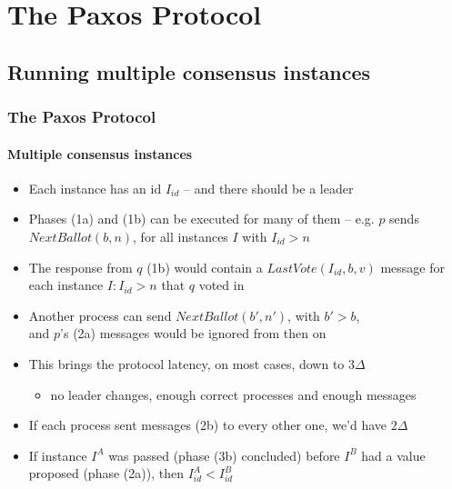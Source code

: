 \documentclass[10 pt]{beamer}
\begin{document}
\section{The Paxos Protocol}

\subsection{Running multiple consensus instances}


\begin{frame}
  \frametitle{The \textbf{Paxos} Protocol}
  \framesubtitle{Multiple consensus instances}
  
  \begin{itemize}
    \item Each instance has an id $I_{id}$ -- and there should be a leader %

    \pause
    \item Phases (1a) and (1b) can be executed for many of them --
    e.g. $p$ sends $NextBallot(b,n)$, for all instances $I$ with $I_{id} > n$
    \item The response from $q$ (1b) would contain a $LastVote(I_{id}, b, v)$ message for each instance $I : I_{id} > n$ that $q$ voted in
    \item Another process can send $NextBallot(b',n')$, with $b' > b$,\\
    and $p$'s (2a) messages would be ignored from then on
    \item This brings the protocol latency, on most cases, down to $3\Delta$
    \begin{itemize}
      \item no leader changes, enough correct processes and enough messages
    \end{itemize}
    
    \pause
    \item If each process sent messages (2b) to every other one, we'd have $2\Delta$ %
        
    \pause
    \item If instance $I^A$ was passed (phase (3b) concluded) before $I^B$ had a value proposed (phase (2a)), then $I^A_{id} < I^B_{id}$
  \end{itemize}

\end{frame}
\end{document}
